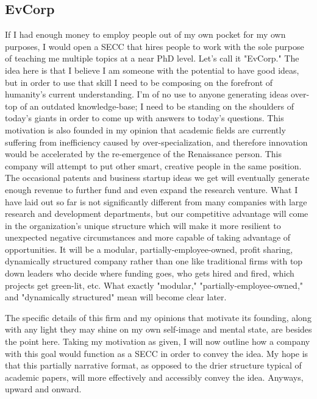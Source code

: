\documentclass{article}[10pt]
\begin{document}
\subsection{EvCorp}
\label{subsection:EvCorp}
If I had enough money to employ people out of my own pocket for my own purposes, I would open a SECC that hires people to work with the sole purpose of teaching me multiple topics at a near PhD level. 
Let's call it "EvCorp."
The idea here is that I believe I am someone with the potential to have good ideas, but in order to use that skill I need to be composing on the forefront of humanity's current understanding. 
I'm of no use to anyone generating ideas over-top of an outdated knowledge-base; I need to be standing on the shoulders of today's giants in order to come up with answers to today's questions. 
This motivation is also founded in my opinion that academic fields are currently suffering from inefficiency caused by over-specialization, and therefore innovation would be accelerated by the re-emergence of the Renaissance person. 
This company will attempt to put other smart, creative people in the same position.
The occasional patents and business startup ideas we get will eventually generate enough revenue to further fund and even expand the research venture. 
What I have laid out so far is not significantly different from many companies with large research and development departments, but our competitive advantage will come in the organization's unique structure which will make it more resilient to unexpected negative circumstances and more capable of taking advantage of opportunities. 
It will be a modular, partially-employee-owned, profit sharing, dynamically structured company rather than one like traditional firms with top down leaders who decide where funding goes, who gets hired and fired, which projects get green-lit, etc.
What exactly "modular," "partially-employee-owned," and "dynamically structured" mean will become clear later.\par 

The specific details of this firm and my opinions that motivate its founding, along with any light they may shine on my own self-image and mental state, are besides the point here. 
Taking my motivation as given, I will now outline how a company with this goal would function as a SECC in order to convey the idea. 
My hope is that this partially narrative format, as opposed to the drier structure typical of academic papers, will more effectively and accessibly convey the idea.
Anyways, upward and onward. \par 
\end{document}
